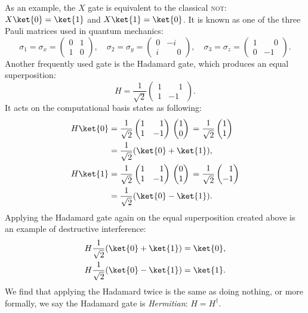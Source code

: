 \documentclass[a4paper,10pt]{article}
\newcommand{\qstatezero}{
	\begin{pmatrix}1 \\ 0\end{pmatrix}
}
\newcommand{\qstateone}{
	\begin{pmatrix}0 \\ 1\end{pmatrix}
}
\newcommand{\hgate}{
	\dfrac{1}{\sqrt2}
	\begin{pmatrix}
		1 & \phantom{-}1 \\
		1 & -1
	\end{pmatrix}
}
\begin{document}
As an example, the $X$ gate is equivalent to the classical \textsc{not}: $X\ket{0} = \ket{1}$ and $X\ket{1} = \ket{0}$.
It is known as one of the three Pauli matrices used in quantum mechanics:
\begin{equation}
\sigma_1 = \sigma_x =
\begin{pmatrix}
0 & 1 \\
1 & 0
\end{pmatrix},
\quad
\sigma_2 = \sigma_y =
\begin{pmatrix}
0 & -i \\
i & \phantom{-}0
\end{pmatrix},
\quad
\sigma_3 = \sigma_z =
\begin{pmatrix}
1 & \phantom{-}0 \\
0 & -1
\end{pmatrix}.
\end{equation}
Another frequently used gate is the Hadamard gate, which produces an equal superposition:
\begin{equation}
H = \hgate{}.
\end{equation}
It acts on the computational basis states as following:
\begin{equation}
\begin{aligned}
H\ket{0} &=
\hgate{}
\qstatezero{}
=
\dfrac{1}{\sqrt2}
\begin{pmatrix}1 \\ 1\end{pmatrix} \\
&= \dfrac{1}{\sqrt2}(\ket{0} + \ket{1}), \\
H\ket{1} &=
\hgate{}
\qstateone{}
=
\dfrac{1}{\sqrt2}
\begin{pmatrix}\phantom{-}1 \\ -1\end{pmatrix} \\
&= \dfrac{1}{\sqrt2}(\ket{0} - \ket{1}).
\end{aligned}
\end{equation}
Applying the Hadamard gate again on the equal superposition created above is an example of destructive interference:
\begin{equation}
\begin{aligned}
H\dfrac{1}{\sqrt2}(\ket{0} + \ket{1}) &= \ket{0}, \\
H\dfrac{1}{\sqrt2}(\ket{0} - \ket{1}) &= \ket{1}.
\end{aligned}
\end{equation}
We find that applying the Hadamard twice is the same as doing nothing, or more formally, we say the Hadamard gate is \emph{Hermitian}: $H = H^\dagger$.
\end{document}
